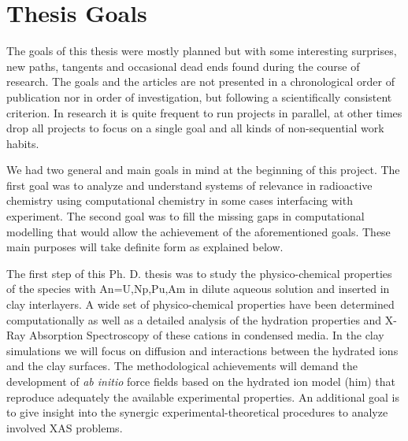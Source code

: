 \chapter[Thesis Goals]{Thesis Goals}\label{c:Goals}
The goals of this thesis were mostly planned but with some interesting 
surprises, new paths, tangents and occasional dead ends found during the course of research. 
The goals and the articles are not presented in a chronological order of publication nor in order 
of investigation, but following a scientifically consistent criterion. In research it is quite 
frequent to run projects in parallel, 
at other times drop all projects to focus on a single goal and all kinds of non-sequential 
work habits.

We had two general and main goals in mind at the beginning of  this project. The first goal was to 
analyze and understand
systems of relevance in radioactive chemistry using computational chemistry in some cases 
interfacing with experiment. The second goal was to fill the missing gaps in computational 
modelling that would allow the achievement of the aforementioned goals. These main purposes 
will take 
definite form as explained below.

The first step of this Ph. D. thesis was to study the physico-chemical properties of the 
 species with An=U,Np,Pu,Am in dilute aqueous solution and inserted in clay 
interlayers. A wide set of physico-chemical properties have been determined computationally as well 
as a detailed analysis of the hydration properties and X-Ray Absorption Spectroscopy of these 
cations in condensed media. In the clay simulations we will focus on diffusion 
and interactions between the hydrated ions and the clay surfaces. The methodological 
achievements will demand the development of  \textit{ab initio} force fields based on the 
hydrated ion model (\gls{him}) that reproduce adequately the available experimental properties. 
An 
additional goal is to give insight into the synergic experimental-theoretical procedures to analyze 
involved XAS 
problems. 

